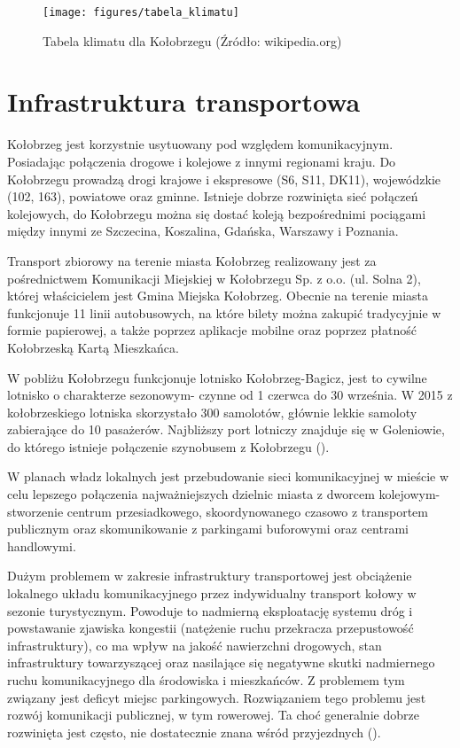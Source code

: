 \documentclass{amuthesis}
\begin{document}
\begin{figure}[t]

{\centering \texttt{[image: figures/tabela\_klimatu]} 

}

\caption{Tabela klimatu dla Kołobrzegu (Źródło: wikipedia.org)}\label{fig:ryc11}
\end{figure}

\hypertarget{inf_trans}{%
\section{Infrastruktura transportowa}\label{inf_trans}}

Kołobrzeg jest korzystnie usytuowany pod względem komunikacyjnym.
Posiadając połączenia drogowe i kolejowe z innymi regionami kraju.
Do Kołobrzegu prowadzą drogi krajowe i ekspresowe (S6, S11, DK11), wojewódzkie (102, 163), powiatowe oraz gminne.
Istnieje dobrze rozwinięta sieć połączeń kolejowych, do Kołobrzegu można się dostać koleją bezpośrednimi pociągami między innymi ze Szczecina, Koszalina, Gdańska, Warszawy i Poznania.

Transport zbiorowy na terenie miasta Kołobrzeg realizowany jest za pośrednictwem Komunikacji Miejskiej w Kołobrzegu Sp. z o.o. (ul. Solna 2), której właścicielem jest Gmina Miejska Kołobrzeg.
Obecnie na terenie miasta funkcjonuje 11 linii autobusowych, na które bilety można zakupić tradycyjnie w formie papierowej, a także poprzez aplikacje mobilne oraz poprzez płatność Kołobrzeską Kartą Mieszkańca.

W pobliżu Kołobrzegu funkcjonuje lotnisko Kołobrzeg-Bagicz, jest to cywilne lotnisko o charakterze sezonowym- czynne od 1 czerwca do 30 września.
W 2015 z kołobrzeskiego lotniska skorzystało 300 samolotów, głównie lekkie samoloty zabierające do 10 pasażerów.
Najbliższy port lotniczy znajduje się w Goleniowie, do którego istnieje połączenie szynobusem z Kołobrzegu (\textcite{lotnisko}).

W planach władz lokalnych jest przebudowanie sieci komunikacyjnej w mieście w celu lepszego połączenia najważniejszych dzielnic miasta z dworcem kolejowym- stworzenie centrum przesiadkowego, skoordynowanego czasowo z transportem publicznym oraz skomunikowanie z parkingami buforowymi oraz centrami handlowymi.

Dużym problemem w zakresie infrastruktury transportowej jest obciążenie lokalnego układu komunikacyjnego przez indywidualny transport kołowy w sezonie turystycznym.
Powoduje to nadmierną eksploatację systemu dróg i powstawanie zjawiska kongestii (natężenie ruchu przekracza przepustowość infrastruktury), co ma wpływ na jakość nawierzchni drogowych, stan infrastruktury towarzyszącej oraz nasilające się negatywne skutki nadmiernego ruchu komunikacyjnego dla środowiska i mieszkańców.
Z problemem tym związany jest deficyt miejsc parkingowych.
Rozwiązaniem tego problemu jest rozwój komunikacji publicznej, w tym rowerowej.
Ta choć generalnie dobrze rozwinięta jest często, nie dostatecznie znana wśród przyjezdnych (\textcite{smartcity}).
\end{document}
